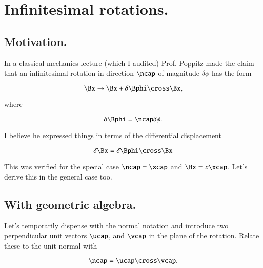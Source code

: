 %
%

\chapter{Infinitesimal rotations.}
\label{chap:infinitesimalRotation}
{}
\date{Jan 27, 2012}

\beginArtWithToc

\section{Motivation.}

In a classical mechanics lecture (which I audited) Prof. Poppitz made the claim that an infinitesimal rotation in direction $\ncap$ of magnitude $\delta \phi$ has the form

\begin{equation}\label{eqn:continuumL6:10}
\Bx \rightarrow \Bx + \delta \Bphi \cross \Bx,
\end{equation}

where

\begin{equation}\label{eqn:continuumL6:30}
\delta \Bphi = \ncap \delta \phi.
\end{equation}

I believe he expressed things in terms of the differential displacement

\begin{equation}\label{eqn:continuumL6:50}
\delta \Bx = \delta \Bphi \cross \Bx
\end{equation}

This was verified for the special case $\ncap = \zcap$ and $\Bx = x \xcap$.  Let's derive this in the general case too.

\section{With geometric algebra.}

Let's temporarily dispense with the normal notation and introduce two perpendicular unit vectors $\ucap$, and $\vcap$ in the plane of the rotation.  Relate these to the unit normal with

\begin{equation}\label{eqn:continuumL6:70}
\ncap = \ucap \cross \vcap.
\end{equation}

